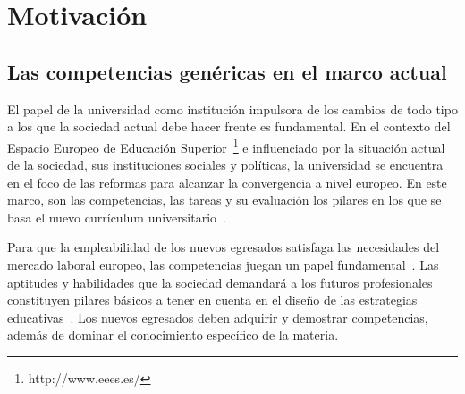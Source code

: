


\section{Motivación}
\label{sec:Motivation}

\subsection*{Las competencias genéricas en el marco actual}

El papel de la universidad como institución impulsora de los cambios de todo tipo a los que la sociedad actual debe hacer frente es fundamental. En el contexto del Espacio Europeo de Educación Superior~\footnote{http://www.eees.es/} e influenciado por la situación actual de  la sociedad, sus instituciones sociales y políticas, la universidad se encuentra en el foco de las reformas para alcanzar la convergencia a nivel europeo. En este marco, son las competencias, las tareas y su evaluación los pilares en los que se basa el nuevo currículum universitario~\cite{zabala2005espacio}.

Para que la empleabilidad de los nuevos egresados satisfaga las necesidades del mercado laboral europeo, las competencias juegan un papel fundamental~\cite{communique2012making}. Las aptitudes y habilidades que la sociedad demandará a los futuros profesionales constituyen pilares básicos a tener en cuenta en el diseño de las estrategias educativas~\cite{de2010project}. Los nuevos egresados deben adquirir y demostrar competencias, además de dominar el conocimiento específico de la materia.

